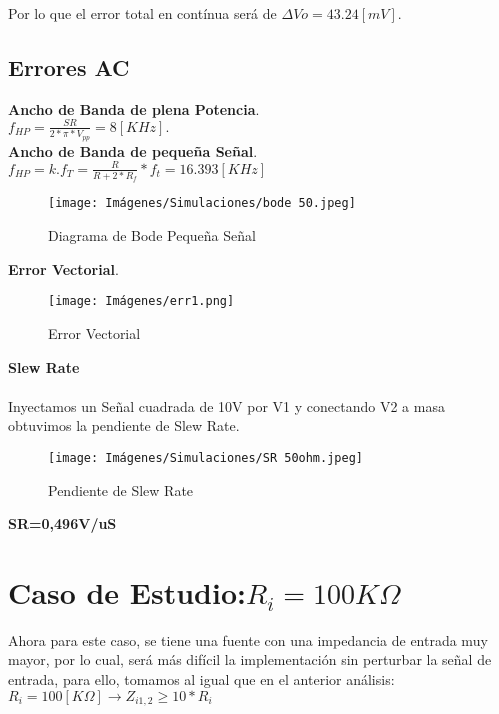 Por lo que el error total en contínua será de $\Delta Vo = 43.24 [mV].$

\subsection{Errores AC}
\textbf{Ancho de Banda de plena Potencia}.\\

$f_{HP} = \frac{SR}{2*\pi*V_{pp}} = 8 [KHz].$\\

\textbf{Ancho de Banda de pequeña Señal}.\\

$f_{HP} = k.f_T = \frac{R}{R+ 2*R_f}*f_t = 16.393 [KHz]$\\
\begin{figure}[ht]
    	\centering
    	\texttt{[image: Imágenes/Simulaciones/bode 50.jpeg]}
    	\caption{Diagrama de Bode Pequeña Señal}
    \end{figure}

\newpage
\textbf{Error Vectorial}.\\

    \begin{figure}[H]
    	\centering
    	\texttt{[image: Imágenes/err1.png]}
    	\caption{Error Vectorial}
    \end{figure}
\textbf{Slew Rate}\\
\\
Inyectamos un Señal cuadrada de 10V por V1 y conectando V2 a masa obtuvimos la pendiente de Slew Rate.\\


    \begin{figure}[H]
    	\centering
    	\texttt{[image: Imágenes/Simulaciones/SR 50ohm.jpeg]}
    	\caption{Pendiente de Slew Rate}
    \end{figure} 
    \centerline{\textbf{SR=0,496V/uS}
    }
    
\section{Caso de Estudio:$R_{i} = 100 K\Omega$ }
Ahora para este caso, se tiene una fuente con una impedancia de entrada muy mayor, por lo cual, será más difícil la implementación sin perturbar la señal de entrada, para ello, tomamos al igual que en el anterior análisis:\\

$R_{i} = 100 [K\Omega] \xrightarrow{} Z_{i1,2} \ge 10*R_{i} $\\

